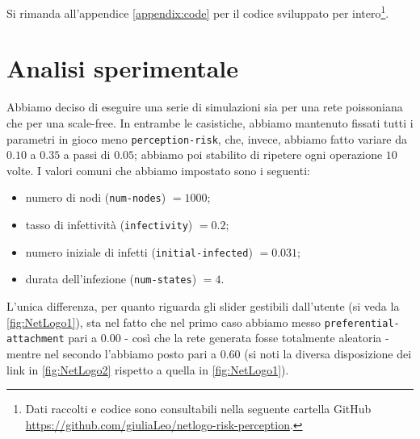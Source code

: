 Si rimanda all'appendice \ref{appendix:code} per il codice sviluppato per intero\footnote{Dati raccolti e codice sono consultabili nella seguente cartella GitHub \url{https://github.com/giuliaLeo/netlogo-risk-perception}.}.
\section{Analisi sperimentale}
Abbiamo deciso di eseguire una serie di simulazioni sia per una rete poissoniana che per una scale-free. In entrambe le casistiche, abbiamo mantenuto fissati tutti i parametri in gioco meno \texttt{perception-risk}, che, invece, abbiamo fatto variare da $ 0.10 $ a $ 0.35 $ a passi di $ 0.05 $; abbiamo poi stabilito di ripetere ogni operazione $ 10 $ volte. I valori comuni che abbiamo impostato sono i seguenti:
\begin{itemize}
\item numero di nodi (\texttt{num-nodes}) $ = 1000 $;
\item tasso di infettività (\texttt{infectivity}) $ = 0.2 $;
\item numero iniziale di infetti (\texttt{initial-infected}) $ = 0.031 $;
\item durata dell'infezione (\texttt{num-states}) $ = 4 $.
\end{itemize}
%
L'unica differenza, per quanto riguarda gli slider gestibili dall'utente (si veda la \cref{fig:NetLogo1}), sta nel fatto che nel primo caso abbiamo messo \texttt{preferential-attachment} pari a $ 0.00 $  - così che la rete generata fosse totalmente aleatoria - mentre nel secondo l'abbiamo posto pari a $ 0.60 $ (si noti la diversa disposizione dei link in \cref{fig:NetLogo2} rispetto a quella in \cref{fig:NetLogo1}).
